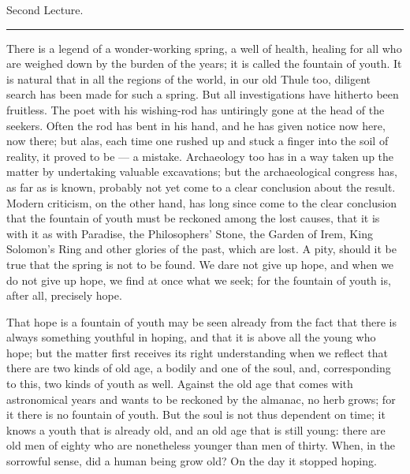 \documentclass[12pt,a4paper,openany]{book}
\newcommand{\opage}[1]{\marginnote{\footnotesize\textit{[#1]}}}
\newcommand{\lecture}[1]{\clearpage\phantomsection\addcontentsline{toc}{chapter}{#1}\begin{center}{\large #1}\\[0.4em]\rule{3em}{0.4pt}\end{center}\medskip\noindent}
\begin{document}
\setcounter{footnote}{0}%
\lecture{Second Lecture.}\opage{18}There is a legend of a wonder-working spring, a
well of health, healing for all who are weighed down by
the burden of the years; it is called the fountain of youth. It is natural
that in all the regions of the world, in our old
Thule too, diligent search has been made for such a spring.
But all investigations have hitherto been fruitless.
The poet with his wishing-rod has untiringly gone at the
head of the seekers. Often the rod has bent in
his hand, and he has given notice now here, now there;
but alas, each time one rushed up and stuck
a finger into the soil of reality, it proved to
be --- a mistake. Archaeology too has in
a way taken up the matter by undertaking valuable
excavations; but the archaeological congress has, as far as is known,
probably not yet come to a clear conclusion
about the result. Modern criticism, on the other hand, has long since
come to the clear conclusion that the fountain of youth must be reckoned
among the lost causes, that it is with it
as with Paradise, the Philosophers' Stone, the Garden of Irem, King
Solomon's Ring and other glories of the past, which are
lost. A pity, should it be true that the spring is not
\setcounter{footnote}{0}%
\opage{19}to be found. We dare not give up hope, and when we
do not give up hope, we find at once what we seek; for
the fountain of youth is, after all, precisely hope.

That hope is a fountain of youth may be seen already
from the fact that there is always something youthful in
hoping, and that it is above all the young who hope; but
the matter first receives its right understanding when we
reflect that there are two kinds of old age, a
bodily and one of the soul, and, corresponding to this, two
kinds of youth as well. Against the old age that comes with
astronomical years and wants to be reckoned by the almanac, no
herb grows; for it there is no fountain of youth. But
the soul is not thus dependent on time; it knows
a youth that is already old, and an old age
that is still young: there are old men of eighty
who are nonetheless younger than men of thirty. When, in
the sorrowful sense, did a human being grow old? On the day
it stopped hoping.
\end{document}
